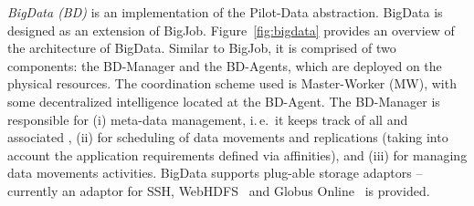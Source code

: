 \documentclass[conference]{IEEEtran}
\begin{document}
{\it BigData (BD)} is an implementation of the Pilot-Data abstraction. BigData
is designed as an extension of BigJob. Figure~\ref{fig:bigdata}
provides an overview of the architecture of BigData. Similar to BigJob, it is
comprised of two components: the BD-Manager and the BD-Agents, which are
deployed on the physical resources. The coordination scheme used is
Master-Worker (MW), with some decentralized intelligence located at the
BD-Agent. The BD-Manager is responsible for (i) meta-data management, i.\,e.\
it keeps track of all \pd and associated \dus, (ii) for scheduling of data
movements and replications (taking into account the application requirements
defined via affinities), and (iii) for managing data movements activities.
BigData supports plug-able storage adaptors -- currently an adaptor for SSH,
WebHDFS~\cite{webhdfs} and Globus Online~\cite{10.1109/MIC.2011.64} is
provided.






\end{document}

